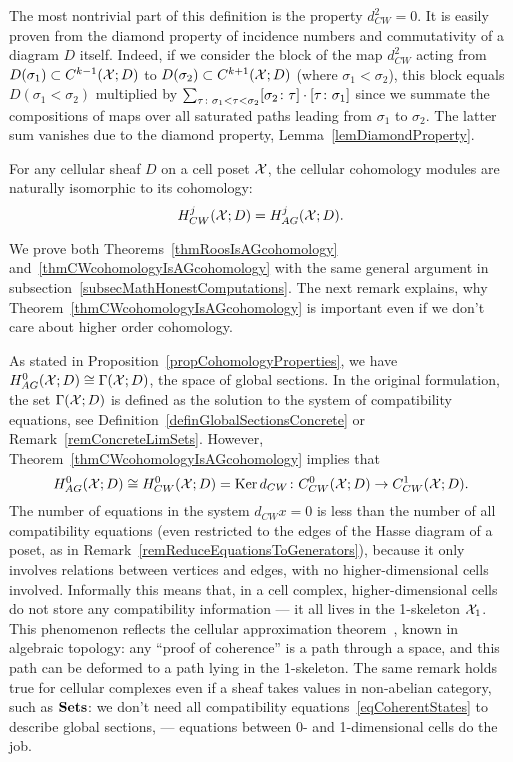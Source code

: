 \begin{rem}
The most nontrivial part of this definition is the property $d_{CW}^2=0$. It is easily proven from the diamond property of incidence numbers and commutativity of a diagram $D$ itself. Indeed, if we consider the block of the map $d_{CW}^2$ acting from $D(\sigma_1)\subset C^{k-1}(\mathcal{X};D)$ to $D(\sigma_2)\subset C^{k+1}(\mathcal{X};D)$ (where $\sigma_1<\sigma_2$), this block equals $D(\sigma_1<\sigma_2)$ multiplied by $\sum_{\tau\colon \sigma_1<\tau<\sigma_2}[\sigma_2\colon \tau]\cdot[\tau\colon \sigma_1]$ since we summate the compositions of maps over all saturated paths leading from $\sigma_1$ to $\sigma_2$. The latter sum vanishes due to the diamond property, Lemma~\ref{lemDiamondProperty}.
\end{rem}

\begin{thm}\label{thmCWcohomologyIsAGcohomology}
For any cellular sheaf $D$ on a cell poset $\mathcal{X}$, the cellular cohomology modules are naturally isomorphic to its cohomology:
\[
H^j_{CW}(\mathcal{X};D)=H^j_{AG}(\mathcal{X};D).
\]
\end{thm}

We prove both Theorems~\ref{thmRoosIsAGcohomology} and~\ref{thmCWcohomologyIsAGcohomology} with the same general argument in subsection~\ref{subsecMathHonestComputations}. The next remark explains, why Theorem~\ref{thmCWcohomologyIsAGcohomology} is important even if we don't care about higher order cohomology.

\begin{rem}\label{remCompatibilityReducesToCells}
As stated in Proposition~\ref{propCohomologyProperties}, we have $H^0_{AG}(\mathcal{X};D)\cong \Gamma(\mathcal{X};D)$, the space of global sections. In the original formulation, the set $\Gamma(\mathcal{X};D)$ is defined as the solution to the system of compatibility equations, see Definition~\ref{definGlobalSectionsConcrete} or Remark~\ref{remConcreteLimSets}. However, Theorem~\ref{thmCWcohomologyIsAGcohomology} implies that
\[
H^0_{AG}(\mathcal{X};D)\cong H^0_{CW}(\mathcal{X};D)=\operatorname{Ker} d_{CW}\colon C^0_{CW}(\mathcal{X};D)\to C^1_{CW}(\mathcal{X};D).
\]
The number of equations in the system $d_{CW}x=0$ is less than the number of all compatibility equations (even restricted to the edges of the Hasse diagram of a poset, as in Remark~\ref{remReduceEquationsToGenerators}), because it only involves relations between vertices and edges, with no higher-dimensional cells involved. Informally this means that, in a cell complex, higher-dimensional cells do not store any compatibility information --- it all lives in the 1-skeleton $\mathcal{X}_1$. This phenomenon reflects the cellular approximation theorem~\cite[p.349]{Hatcher}, known in algebraic topology: any ``proof of coherence'' is a path through a space, and this path can be deformed to a path lying in the 1-skeleton. The same remark holds true for cellular complexes even if a sheaf takes values in non-abelian category, such as $\mathbf{Sets}$: we don't need all compatibility equations~\eqref{eqCoherentStates} to describe global sections, --- equations between 0- and 1-dimensional cells do the job.
\end{rem}

